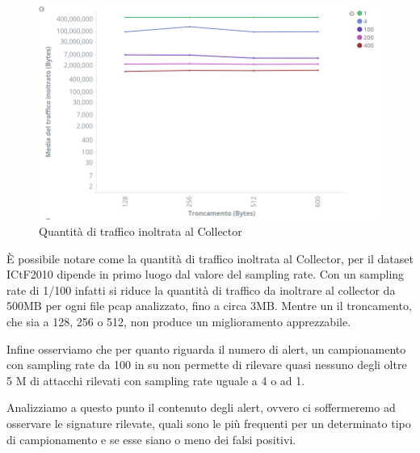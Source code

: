\documentclass[12pt,a4paper,openright,twoside]{report}
\begin{document}
\begin{figure}[h!]
\begin{center}                          %
  \includegraphics[width=\textwidth]{images/ICTF-trunc-vs-traffic.png}
  \caption{Quantit\`a di traffico inoltrata al Collector}
  \label{fig:ictf:traff-t}
\end{center}
\end{figure}

\`E possibile notare come la quantit\`a di traffico inoltrata al Collector,
per il dataset ICtF2010 dipende in primo luogo dal valore del sampling rate.
Con un sampling rate di 1/100 infatti si riduce la quantit\`a di traffico da inoltrare al
collector da 500MB per ogni file pcap analizzato, fino a circa 3MB.
Mentre un il troncamento, che sia a 128, 256 o 512, non produce un miglioramento apprezzabile.

Infine osserviamo che per quanto riguarda il numero di alert,
 un campionamento con sampling rate da 100 in su non permette
di rilevare quasi nessuno degli oltre 5 M di attacchi rilevati con
sampling rate uguale a 4 o ad 1.

Analizziamo a questo punto il contenuto degli alert, ovvero ci soffermeremo ad osservare le signature
rilevate, quali sono le pi\`u frequenti per un determinato tipo di campionamento e
se esse siano o meno dei falsi positivi.
\end{document}
